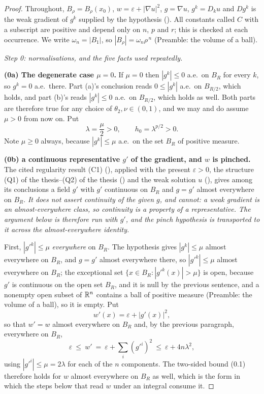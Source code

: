 \begin{proof}
Throughout, $B_\rho=B_\rho(x_0)$, $w=\varepsilon+|\nabla u|^2$, $g=\nabla u$,
$g^k=D_ku$ and $Dg^k$ is the weak gradient of $g^k$ supplied by the hypothesis
().  All constants called $C$ with a subscript are positive
and depend only on $n$, $p$ and $r$; this is checked at each occurrence.  We
write $\omega_n=|B_1|$, so $|B_\rho|=\omega_n\rho^{\,n}$ (Preamble: the volume of
a ball).

\emph{Step 0: normalisations, and the five facts used repeatedly.}

\textbf{(0a) The degenerate case $\mu=0$.}  If $\mu=0$ then $|g^k|\le0$ a.e.\ on
$B_R$ for every $k$, so $g^k=0$ a.e.\ there.  Part (a)'s conclusion reads
$0\le|g^k|$ a.e.\ on $B_{R/2}$, which holds, and part (b)'s reads $|g^k|\le0$
a.e.\ on $B_{R/2}$, which holds as well.  Both parts are therefore true for any
choice of $\theta_2,\nu\in(0,1)$, and we may and do assume $\mu>0$ from now on.
Put
\[
\lambda=\frac\mu2>0,\qquad h_0=\lambda^{p/2}>0 .
\]
Note $\mu\ge0$ always, because $|g^k|\le\mu$ a.e.\ on the set $B_R$ of positive
measure.

\textbf{(0b) a continuous representative $g'$ of the gradient, and $w$ is
pinched.}  The cited regularity result
(C1) (), applied with the present
$\varepsilon>0$, the structure (Q1) of the thesis--(Q2) of the thesis
() and the weak solution $u$
(), gives among its conclusions a field $g'$ with
$g'$ continuous on $B_R$ and $g=g'$ almost everywhere on $B_R$.  \emph{It does
not assert continuity of the given $g$, and cannot: a weak gradient is an
almost-everywhere class, so continuity is a property of a representative.  The
argument below is therefore run with $g'$, and the pinch hypothesis is
transported to it across the almost-everywhere identity.}

First, $|g'^k|\le\mu$ \emph{everywhere} on $B_R$.  The hypothesis gives
$|g^k|\le\mu$ almost everywhere on $B_R$, and $g=g'$ almost everywhere there, so
$|g'^k|\le\mu$ almost everywhere on $B_R$; the exceptional set
$\{x\in B_R:|g'^k(x)|>\mu\}$ is open, because $g'$ is continuous on the open set
$B_R$, and it is null by the previous sentence, and a
nonempty open subset of $\mathbb{R}^n$ contains a ball of positive measure (Preamble: the
volume of a ball), so it is empty.  Put
\[
w'(x)=\varepsilon+|g'(x)|^2 ,
\]
so that $w'=w$ almost everywhere on $B_R$ and, by the previous paragraph,
everywhere on $B_R$,
\[
\varepsilon\ \le\ w'\ =\ \varepsilon+\sum_{i}(g'^i)^2\ \le\ \varepsilon+4n\lambda^2 ,
\tag{0.1}
\]
using $|g'^i|\le\mu=2\lambda$ for each of the $n$ components.  The two-sided
bound (0.1) therefore holds for $w$ almost everywhere on $B_R$ as well, which is
the form in which the steps below that read $w$ under an integral consume it.


\end{proof}
